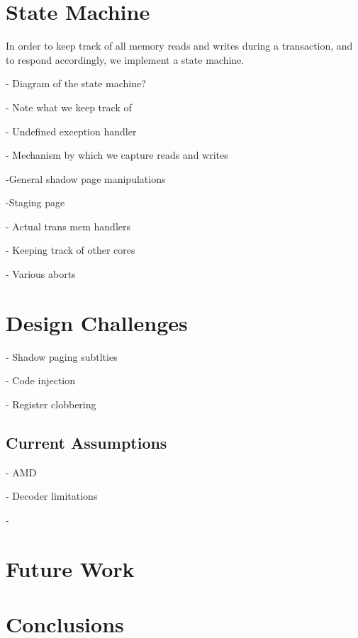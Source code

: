 \documentclass{acm_proc_article-sp}
\begin{document}
\section{State Machine}
In order to keep track of all memory reads and writes during a transaction, 
and to respond accordingly, we implement a state machine.

- Diagram of the state machine?

- Note what we keep track of

- Undefined exception handler

- Mechanism by which we capture reads and writes

    -General shadow page manipulations

    -Staging page

- Actual trans mem handlers

- Keeping track of other cores

- Various aborts

\section{Design Challenges}
- Shadow paging subtlties

- Code injection

- Register clobbering

\subsection{Current Assumptions}
- AMD

- Decoder limitations

- 

\section{Future Work}

\section{Conclusions}


\end{document}
